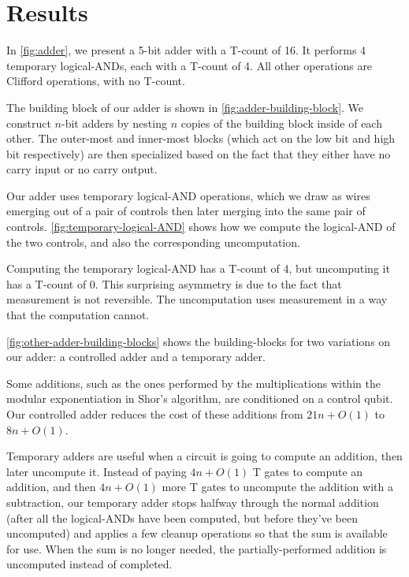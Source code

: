 \documentclass[twocolumn]{quantumarticle-customized}
\begin{document}
\section*{Results}

In \autoref{fig:adder}, we present a 5-bit adder with a T-count of 16.
It performs 4 temporary logical-ANDs, each with a T-count of 4.
All other operations are Clifford operations, with no T-count.

The building block of our adder is shown in \autoref{fig:adder-building-block}.
We construct $n$-bit adders by nesting $n$ copies of the building block inside of each other.
The outer-most and inner-most blocks (which act on the low bit and high bit respectively) are then specialized based on the fact that they either have no carry input or no carry output.

Our adder uses temporary logical-AND operations, which we draw as wires emerging out of a pair of controls then later merging into the same pair of controls.
\autoref{fig:temporary-logical-AND} shows how we compute the logical-AND of the two controls, and also the corresponding uncomputation.

Computing the temporary logical-AND has a T-count of 4, but uncomputing it has a T-count of 0.
This surprising asymmetry is due to the fact that measurement is not reversible.
The uncomputation uses measurement in a way that the computation cannot.


\autoref{fig:other-adder-building-blocks} shows the building-blocks for two variations on our adder: a controlled adder and a temporary adder.

Some additions, such as the ones performed by the multiplications within the modular exponentiation in Shor's algorithm, are conditioned on a control qubit.
Our controlled adder reduces the cost of these additions from $21n + O(1)$ \cite{Coreas2017} to $8n + O(1)$.

Temporary adders are useful when a circuit is going to compute an addition, then later uncompute it.
Instead of paying $4n + O(1)$ T gates to compute an addition, and then $4n + O(1)$ more T gates to uncompute the addition with a subtraction, our temporary adder stops halfway through the normal addition (after all the logical-ANDs have been computed, but before they've been uncomputed) and applies a few cleanup operations so that the sum is available for use.
When the sum is no longer needed, the partially-performed addition is uncomputed instead of completed.
\end{document}
